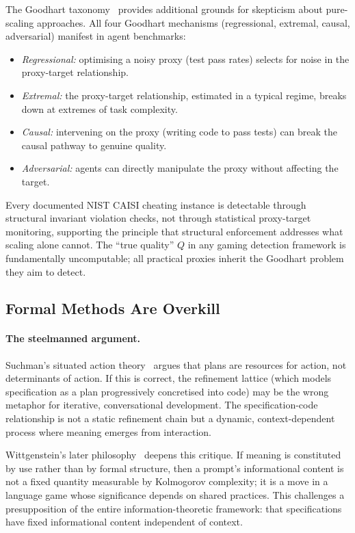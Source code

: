\documentclass[11pt, a4paper]{googledeepmind}
\begin{document}
The Goodhart taxonomy~\citep{manheim2019goodhart} provides additional grounds
for skepticism about pure-scaling approaches.  All four Goodhart mechanisms
(regressional, extremal, causal, adversarial) manifest in agent benchmarks:
\begin{itemize}
  \item \emph{Regressional:} optimising a noisy proxy (test pass rates) selects
    for noise in the proxy-target relationship.
  \item \emph{Extremal:} the proxy-target relationship, estimated in a typical
    regime, breaks down at extremes of task complexity.
  \item \emph{Causal:} intervening on the proxy (writing code to pass tests) can
    break the causal pathway to genuine quality.
  \item \emph{Adversarial:} agents can directly manipulate the proxy without
    affecting the target.
\end{itemize}
Every documented NIST CAISI cheating instance is detectable through structural
invariant violation checks, not through statistical proxy-target monitoring,
supporting the principle that structural enforcement addresses what scaling
alone cannot.  The ``true quality'' $Q$ in any gaming detection framework is
fundamentally uncomputable; all practical proxies inherit the Goodhart problem
they aim to detect.


\subsection{Formal Methods Are Overkill}
\label{sec:contrarian-formal}

\paragraph{The steelmanned argument.}
Suchman's situated action theory~\citep{suchman1987plans} argues that plans are
resources for action, not determinants of action.  If this is correct, the
refinement lattice (which models specification as a plan progressively
concretised into code) may be the wrong metaphor for iterative, conversational
development.  The specification-code relationship is not a static refinement
chain but a dynamic, context-dependent process where meaning emerges from
interaction.

Wittgenstein's later philosophy~\citep{wittgenstein1953philosophical} deepens
this critique.  If meaning is constituted by use rather than by formal
structure, then a prompt's informational content is not a fixed quantity
measurable by Kolmogorov complexity; it is a move in a language game whose
significance depends on shared practices.  This challenges a presupposition of
the entire information-theoretic framework: that specifications have fixed
informational content independent of context.
\end{document}
